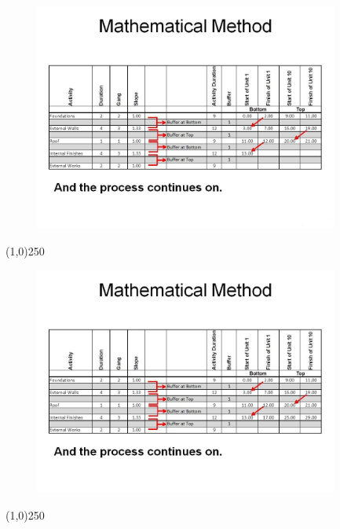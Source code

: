\begin{frame}
\begin{figure}
	\centering
		\includegraphics[width = 10.0cm]{oldnotes/Slide292.jpg}
\end{figure}
\end{frame}
\begin{center}\line(1,0){250}\end{center}






\begin{frame}
\begin{figure}
	\centering
		\includegraphics[width = 10.0cm]{oldnotes/Slide293.jpg}
\end{figure}
\end{frame}
\begin{center}\line(1,0){250}\end{center}





